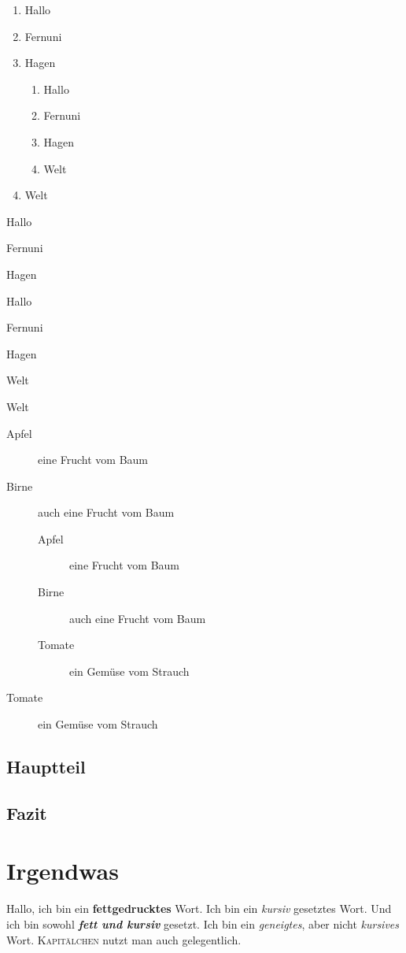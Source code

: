 \documentclass[12pt,ngerman,parskip=half]{scrreprt}
\begin{document}
\begin{enumerate}
\item Hallo
\item Fernuni
\item Hagen
\begin{enumerate}
\item Hallo
\item Fernuni
\item Hagen
\item Welt
\end{enumerate}
\item Welt
\end{enumerate}

\begin{compactenum}[I]
\item Hallo
\item Fernuni
\item Hagen
\begin{compactenum}[A.]
\item Hallo
\item Fernuni
\item Hagen
\item Welt
\end{compactenum}
\item Welt
\end{compactenum}


\begin{description}
\item[Apfel] eine Frucht vom Baum
\item[Birne] auch eine Frucht vom Baum

\begin{description}
\item[Apfel] eine Frucht vom Baum
\item[Birne] auch eine Frucht vom Baum
\item[Tomate] ein Gemüse vom Strauch
\end{description}

\item[Tomate] ein Gemüse vom Strauch
\end{description}


\section{Hauptteil}

\blindtext[1] 

\blindtext[1]

\section{Fazit}

\blindtext[1] 

\chapter{Irgendwas}

Hallo, ich bin ein \textbf{fettgedrucktes} Wort. Ich bin ein \textit{kursiv} gesetztes Wort. Und ich bin sowohl \textbf{\textit{fett und kursiv}} gesetzt. Ich bin ein \textsl{geneigtes}, aber nicht \textit{kursives} Wort. \textsc{Kapitälchen} nutzt man auch gelegentlich.
\end{document}
